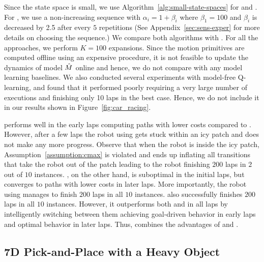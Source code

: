 Since the state space is small, we use
Algorithm~\ref{alg:small-state-spaces} for \cmaxpp{} and
\acmaxpp{}. For \acmaxpp{}, we use a non-increasing sequence with
$\alpha_i = 1 + \beta_i$ where $\beta_1 = 100$ and $\beta_i$ is
decreased by 2.5 after every $5$ repetitions (See Appendix~\ref{sec:sens-exper} for more details on choosing the sequence.) We
compare both algorithms with \cmax{}. For all the approaches, we
perform $K=100$ expansions. Since
the motion primitives are computed offline using an expensive
procedure, it is not feasible to update the dynamics of model $\hat{M}$
online and hence, we do not compare with any model learning baselines. We
also conducted several experiments with model-free Q-learning, and found that it
performed poorly requiring a very large number of executions and finishing
only 10 laps in the best case. Hence, we do not include it in our
results shown in Figure~\ref{fig:car_racing}.

\cmax{} performs
well in the early laps computing paths with lower costs compared to
\cmaxpp{}. However, after a few laps the robot using \cmax{} gets
stuck within an icy patch and does not make any more progress. Observe
that when the robot is inside the icy patch,
Assumption~\ref{assumption:cmax} is violated and \cmax{} ends up
inflating all transitions that take the robot out of the patch leading
to the robot finishing $200$ laps in $2$ out of $10$
instances. \cmaxpp{}, on the other hand, is suboptimal in the initial
laps, but converges to paths with lower costs in later
laps. More importantly, the robot using \cmaxpp{} manages to finish
$200$ laps in all $10$ instances. \acmaxpp{} also successfully
finishes $200$ laps in all $10$ instances. However, it 
outperforms both \cmax{} and \cmaxpp{} in all laps by intelligently switching between them achieving goal-driven behavior in early laps and optimal behavior in later laps.
Thus, \acmaxpp{} combines the
advantages of \cmax{} and \cmaxpp{}.



\subsection{7D Pick-and-Place with a Heavy Object}
\label{sec:simulated-7d-pick}


